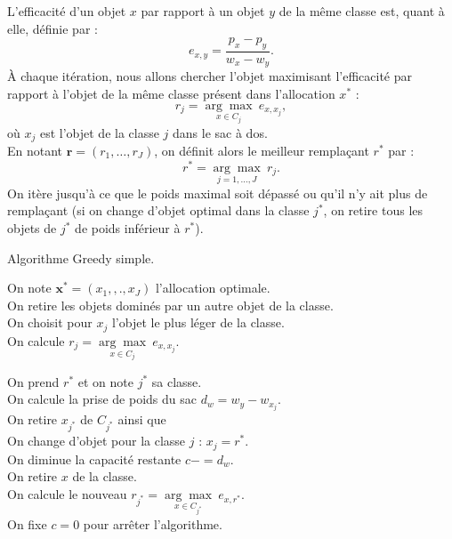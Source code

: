 \documentclass{article}
\begin{document}
L'efficacité d'un objet $x$ par rapport à un objet $y$ de la même classe est, quant à elle, définie par :
\begin{equation*}
    e_{x,y} = \frac{p_x - p_y}{w_x - w_y}.
\end{equation*}
À chaque itération, nous allons chercher l'objet maximisant l'efficacité par rapport à l'objet de la même classe présent dans l'allocation $x^*$ :
\[ r_j = \underset{x\in C_j}{\arg\max}\ e_{x,x_j},\] où $x_j$ est l'objet de la classe $j$ dans le sac à dos.\\
En notant $\mathbf{r}=\left(r_1,\dots,r_J\right)$, on définit alors le meilleur remplaçant $r^*$ par :
\[ r^* = \underset{j=1,\dots,J}{\arg\max}\ r_j.\]
On itère jusqu'à ce que le poids maximal soit dépassé ou qu'il n'y ait plus de remplaçant (si on change d'objet optimal dans la classe $j^*$, on retire tous les objets de $j^*$ de poids inférieur à $r^*$). 
\begin{algorithm}[!ht]
\caption{Algorithme Greedy simple.}
\label{alg:greedy-simple}
\small
{}
	On note $\mathbf{x}^{*} = (x_1, ,., x_{J})$ l'allocation optimale.\\
	{
	    On retire les objets dominés par un autre objet de la classe.\\
	    On choisit pour $x_j$ l'objet le plus léger de la classe.\\
	    On calcule $r_j = \underset{x\in C_j}{\arg\max}\ e_{x,x_j}$.
	}
	
	{
	    On prend $r^*$ et on note $j^*$ sa classe.\\
	    On calcule la prise de poids du sac $d_w = w_y-w_{x_j}$.\\
		{
		On retire $x_{j^*}$ de $C_{j^*}$ ainsi que\\
		On change d'objet pour la classe $j$ : $x_j = r^*$.\\
		On diminue la capacité restante $c -= d_w$.\\
		
	    {
		    {
		        On retire $x$ de la classe.\\
		    }
	    }
	    On calcule le nouveau $r_{j^*} = \underset{x\in C_{j^*}}{\arg\max}\ e_{x,r^*}$. \\
	    }
	    {
	    On fixe $c=0$ pour arrêter l'algorithme.
	    }
	}
\end{algorithm}
\end{document}
